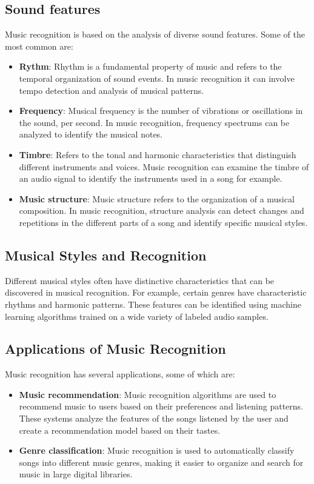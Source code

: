 \subsection{Sound features}

Music recognition is based on the analysis of diverse sound features. Some of the most common are:

\begin{itemize}
\item \textbf{Rythm}: Rhythm is a fundamental property of music and refers to the temporal organization of sound events. In music recognition it can involve tempo detection and analysis of musical patterns.

\item \textbf{Frequency}: Musical frequency is the number of vibrations or oscillations in the sound, per second. In music recognition, frequency spectrums can be analyzed to identify the musical notes.

\item \textbf{Timbre}: Refers to the tonal and harmonic characteristics that distinguish different instruments and voices. Music recognition can examine the timbre of an audio signal to identify the instruments used in a song for example.

\item \textbf{Music structure}: Music structure refers to the organization of a musical composition. In music recognition, structure analysis can detect changes and repetitions in the different parts of a song and identify specific musical styles.
\end{itemize}

\subsection{Musical Styles and Recognition}
Different musical styles often have distinctive characteristics that can be discovered in musical recognition. For example, certain genres have characteristic rhythms and harmonic patterns. 
These features can be identified using machine learning algorithms trained on a wide variety of labeled audio samples.

\subsection{Applications of Music Recognition}
Music recognition has several applications, some of which are:

\begin{itemize}
\item \textbf{Music recommendation}: Music recognition algorithms are used to recommend music to users based on their preferences and listening patterns. These systems analyze the features of the songs listened by the user and create a recommendation model based on their tastes.

\item \textbf{Genre classification}: Music recognition is used to automatically classify songs into different music genres, making it easier to organize and search for music in large digital libraries.
\end{itemize}

